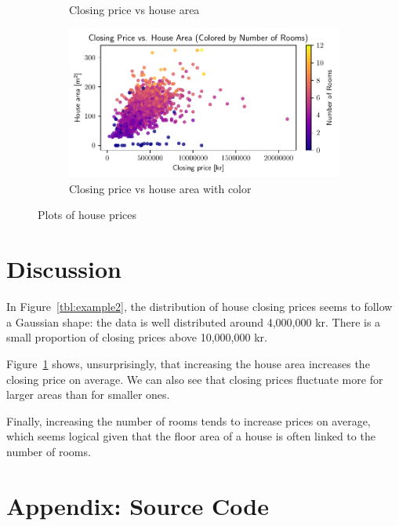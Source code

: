 \documentclass[a4paper]{article}
\begin{document}
\begin{figure}
\begin{subfigure}[b]{\textwidth}
      \caption{Closing price vs house area}
      \label{fig:closing_price_house_ares}
  \end{subfigure}
  \vfill
  \begin{subfigure}[c]{\textwidth}
      \centering
      \includegraphics[width=\textwidth]{closing_price_house_ares_color.pdf}
      \caption{Closing price vs house area with color}
      \label{fig:closing_price_house_ares_color}
  \end{subfigure}
     \caption{Plots of house prices}
     \label{fig:house_plots}
\end{figure}


\newpage

\section*{Discussion}

In Figure~\ref{tbl:example2}, the distribution of house closing prices seems to follow a Gaussian shape: the data is well distributed around 4,000,000 kr.
There is a small proportion of closing prices above 10,000,000 kr.

Figure~\ref{fig:closing_price_house_ares} shows, unsurprisingly, that increasing the house area increases the closing price on average.
We can also see that closing prices fluctuate more for larger areas than for smaller ones.

Finally, increasing the number of rooms tends to increase prices on average, which seems logical given that the floor area of a house is often linked to the number of rooms.

\newpage


\printbibliography

\section*{Appendix: Source Code}




\end{document}
